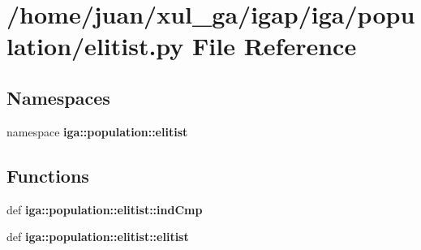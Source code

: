 \section{/home/juan/xul\_\-ga/igap/iga/population/elitist.py File Reference}
\label{elitist_8py}
\subsection*{Namespaces}
\begin{CompactItemize}
\item 
namespace {\bf iga::population::elitist}
\end{CompactItemize}
\subsection*{Functions}
\begin{CompactItemize}
\item 
def {\bf iga::population::elitist::indCmp}
\item 
def {\bf iga::population::elitist::elitist}
\end{CompactItemize}
